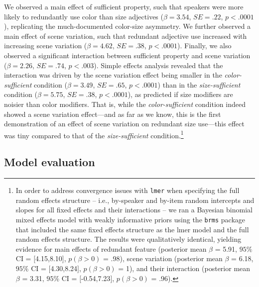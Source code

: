 \documentclass[11pt]{article}
\begin{document}
We observed a main effect of sufficient property, such that speakers were more likely to redundantly use color than size adjectives ($\beta = 3.54$, $SE = .22$, $p < .0001$), replicating the much-documented color-size asymmetry. We further observed a main effect of scene variation, such that redundant adjective use increased with increasing scene variation ($\beta = 4.62$, $SE = .38$, $p < .0001$). Finally, we also observed a significant interaction between sufficient property and scene variation ($\beta = 2.26$, $SE = .74$, $p < .003$). Simple effects analysis revealed that the interaction was driven by the scene variation effect being smaller in the \emph{color-sufficient} condition ($\beta = 3.49$, $SE = .65$, $p < .0001$) than in the \emph{size-sufficient} condition ($\beta = 5.75$, $SE = .38$, $p < .0001$), as predicted if size modifiers are noisier than color modifiers. That is, while the \emph{color-sufficient} condition indeed showed a scene variation effect---and as far as we know, this is the first demonstration of an effect of scene variation on redundant size use---this effect was tiny compared to that of the \emph{size-sufficient} condition.\footnote{In order to address convergence issues with \verb+lmer+ when specifying the full random effects structure -- i.e., by-speaker and by-item random intercepts and slopes for all fixed effects and their interactions -- we ran a Bayesian binomial mixed effects model with weakly informative priors using the \verb+brms+ package \cite{brms} that included the same fixed effects structure as the lmer model and the full random effects structure. The results were qualitatively identical, yielding  evidence for main effects of redundant feature (posterior mean $\beta$ = 5.91, $95\%$ CI = $[$4.15,8.10$]$, $p(\beta > 0)$ = .98), scene variation (posterior mean $\beta$ = 6.18, $95\%$ CI = $[$4.30,8.24$]$, $p(\beta > 0)$ = 1), and their interaction (posterior mean $\beta$ = 3.31, $95\%$ CI = $[$-0.54,7.23$]$, $p(\beta > 0)$ = .96).}


\subsection{Model evaluation}
\label{sec:modifiermodeleval}
\end{document}
